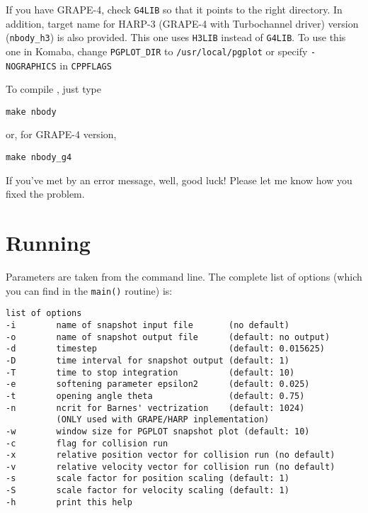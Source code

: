 If you have GRAPE-4, check {\tt G4LIB} so that it points to the right
directory. In addition, target name for HARP-3 (GRAPE-4 with
Turbochannel driver) version ({\tt nbody\_h3}) is also provided. This
one uses {\tt H3LIB} instead of {\tt G4LIB}. To use this one in
Komaba, change {\tt PGPLOT\_DIR} to {\tt /usr/local/pgplot} or specify 
{\tt -NOGRAPHICS} in {\tt CPPFLAGS}

To compile \nbody, just type
\begin{verbatim}
make nbody
\end{verbatim}
or, for GRAPE-4 version, 
\begin{verbatim}
make nbody_g4
\end{verbatim}
If you've met by an error message, well, good luck! Please let me know 
how you fixed the problem.

\section{Running \nbody}
Parameters are taken from the command line.
The complete list of options (which you can find in the {\tt main()}
routine) is:

\begin{verbatim}
list of options
-i        name of snapshot input file       (no default)
-o        name of snapshot output file      (default: no output)
-d        timestep                          (default: 0.015625)
-D        time interval for snapshot output (default: 1)
-T        time to stop integration          (default: 10)
-e        softening parameter epsilon2      (default: 0.025)
-t        opening angle theta               (default: 0.75)
-n        ncrit for Barnes' vectrization    (default: 1024)
          (ONLY used with GRAPE/HARP inplementation)
-w        window size for PGPLOT snapshot plot (default: 10)
-c        flag for collision run
-x        relative position vector for collision run (no default)
-v        relative velocity vector for collision run (no default)
-s        scale factor for position scaling (default: 1)
-S        scale factor for velocity scaling (default: 1)
-h        print this help
\end{verbatim}

